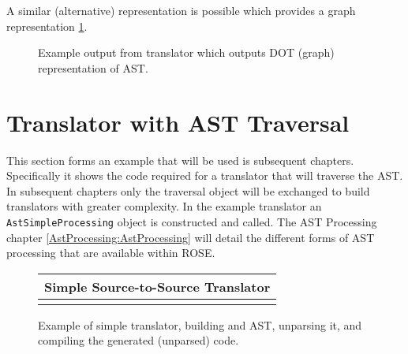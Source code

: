     A similar (alternative) representation is possible which provides a graph 
representation \ref{translatorDesign:dotOutput1.ps}.

\begin{figure}
\centerline{}
\caption{Example output from translator which outputs DOT (graph) representation of AST.}
\label{translatorDesign:dotOutput1.ps}
\end{figure}

\section{Translator with AST Traversal}

   This section forms an example that will be used is subsequent chapters.
Specifically it shows the code required for a translator that will
traverse the AST.  In subsequent chapters only the traversal object will be
exchanged to build translators with greater complexity.
In the example translator \label{translatorDesign:AstTraversalTranslator}
an {\tt AstSimpleProcessing} object is constructed and called. The AST Processing
chapter \ref{AstProcessing:AstProcessing} will detail the different forms of
AST processing that are available within ROSE.

{\indent
{\mySmallFontSize

\begin{latexonly}
%  
\begin{figure}[tb]
\begin{center}
\begin{tabular}{|c|} \hline
     Simple Source-to-Source Translator
\\\hline\hline

\\\hline
\end{tabular}
\end{center}
\caption{ Example of simple translator, building and AST, unparsing it, and compiling
    the generated (unparsed) code. }
\end{figure}
\end{latexonly}

\begin{htmlonly}
   
\end{htmlonly}

\label{translatorDesign:AstTraversalTranslator}

}
}


